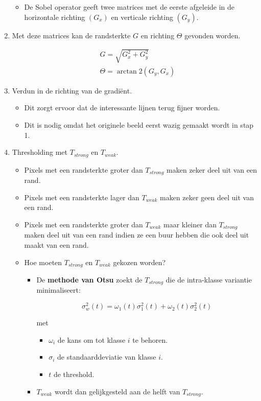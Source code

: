 \begin{enumerate}
\begin{itemize}
		\item De Sobel operator geeft twee matrices met de eerste afgeleide in de horizontale richting $(G_x)$ en verticale richting $(G_y)$.
	
	\end{itemize}
	\item Met deze matrices kan de randsterkte $G$ en richting $\Theta$ gevonden worden.

		\begin{equation*}
			\begin{split}
				& G = \sqrt{G_x^2 + G_y^2} \\
				& \Theta = \arctan 2(G_y, G_x)
			\end{split}
		\end{equation*}

	
	\item Verdun in de richting van de gradiënt.
	\begin{itemize}
		\item Dit zorgt ervoor dat de interessante lijnen terug fijner worden. 
		\item Dit is nodig omdat het originele beeld eerst wazig gemaakt wordt in stap 1.
	\end{itemize}

	\item Thresholding met $T_{strong}$ en $T_{weak}$.
	\begin{itemize}
		\item Pixels met een randsterkte groter dan $T_{strong}$ maken zeker deel uit van een rand.
		\item Pixels met een randsterkte lager dan $T_{weak}$ maken zeker geen deel uit van een rand.
		\item Pixels met een randsterkte groter dan $T_{weak}$ maar kleiner dan $T_{strong}$ maken deel uit van een rand indien ze een buur hebben die ook deel uit maakt van een rand. 
		\item Hoe moeten $T_{strong}$ en $T_{weak}$ gekozen worden?
		\begin{itemize}
			\item De \textbf{methode van Otsu} zoekt de $T_{strong}$ die de intra-klasse variantie minimaliseert:
			
			$$\sigma^2_w(t) = \omega_1(t)\sigma_1^2(t) + \omega_2(t)\sigma_2^2(t)$$
			
			met \begin{itemize}
				\item $\omega_i$ de kans om tot klasse $i$ te behoren.
				\item $\sigma_i$ de standaarddeviatie van klasse $i$.
				\item $t$ de threshold.
			\end{itemize}
			\item $T_{weak}$ wordt dan gelijkgesteld aan de helft van $T_{strong}$.
		\end{itemize}
	\end{itemize}
\end{enumerate}

